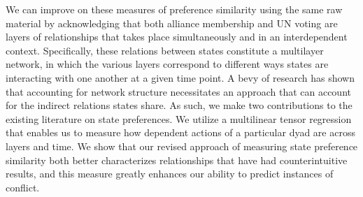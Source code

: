 We can improve on these measures of preference similarity using the same raw material by acknowledging that both alliance membership and UN voting are layers of relationships that takes place simultaneously and in an interdependent context. Specifically, these relations between states constitute a multilayer network, in which the various layers correspond to different ways states are interacting with one another at a given time point. A bevy of research has shown that accounting for network structure necessitates an approach that can account for the indirect relations states share. As such, we make two contributions to the existing literature on state preferences. We utilize a multilinear tensor regression that enables us to measure how dependent actions of a particular dyad are across layers and time. We show that our revised approach of measuring state preference similarity both better characterizes relationships that have had counterintuitive results, and this measure greatly enhances our ability to predict instances of conflict.